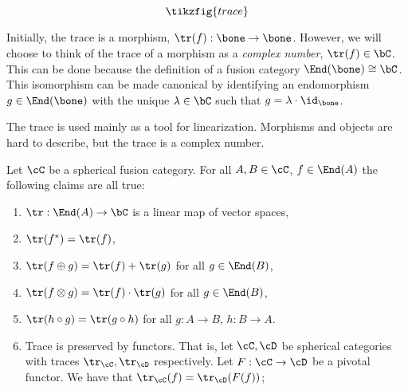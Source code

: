 \begin{equation*}
\tikzfig{trace}
\end{equation*}

Initially, the trace is a morphism,  $\tr(f):\bone\to\bone$. However, we will choose to think of the trace of a morphism as a \textit{complex number}, $\tr(f)\in \bC$. This can be done because the definition of a fusion category $\End(\bone)\cong \bC$. This isomorphism can be made canonical by identifying an endomorphism $g\in \End(\bone)$ with the unique $\lambda\in \bC$ such that $g = \lambda \cdot \id_{\bone}$.

The trace is used mainly as a tool for linearization. Morphisms and objects are hard to describe, but the trace is a complex number.

\begin{prop} Let $\cC$ be a spherical fusion category. For all $A,B\in \cC$, $f\in \End(A)$ the following claims are all true:

\begin{enumerate}
\item $\tr: \End(A)\to \bC$ is a linear map of vector spaces,
\item $\tr(f^{*})=\tr(f)$,
\item $\tr(f\oplus g)=\tr(f)+\tr(g)$ for all $g\in \End(B)$,
\item $\tr(f\otimes g)=\tr(f)\cdot \tr(g)$ for all $g\in \End(B)$,
\item $\tr(h\circ g)=\tr(g\circ h)$ for all $g:A\to B$, $h:B\to A$.
\item Trace is preserved by functors. That is, let $\cC,\cD$ be spherical categories with traces $\tr_{\cC},\tr_{\cD}$ respectively. Let $F:\cC\to \cD$ be a pivotal functor. We have that $\tr_{\cC}(f)=\tr_{\cD}(F(f))$;
\end{enumerate}

\end{prop}
